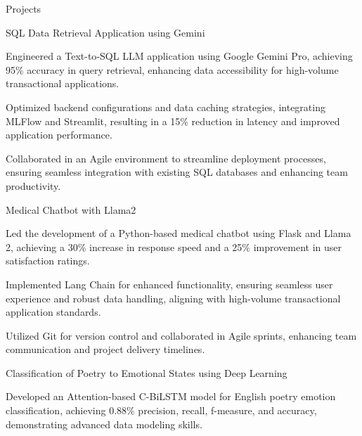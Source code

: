 \documentclass{resume} %
\begin{document}
    \begin{rSection}{Projects}
                    \begin{rSubsection}
                                    {SQL Data Retrieval Application using Gemini}
                                {}{}{}
                                    \item Engineered a Text{-}to{-}SQL LLM application using Google Gemini Pro, achieving 95\% accuracy in query retrieval, enhancing data accessibility for high{-}volume transactional applications.
                                    \item Optimized backend configurations and data caching strategies, integrating MLFlow and Streamlit, resulting in a 15\% reduction in latency and improved application performance.
                                    \item Collaborated in an Agile environment to streamline deployment processes, ensuring seamless integration with existing SQL databases and enhancing team productivity.
                            \end{rSubsection}
                    \begin{rSubsection}
                                    {Medical Chatbot with Llama2}
                                {}{}{}
                                    \item Led the development of a Python{-}based medical chatbot using Flask and Llama 2, achieving a 30\% increase in response speed and a 25\% improvement in user satisfaction ratings.
                                    \item Implemented Lang Chain for enhanced functionality, ensuring seamless user experience and robust data handling, aligning with high{-}volume transactional application standards.
                                    \item Utilized Git for version control and collaborated in Agile sprints, enhancing team communication and project delivery timelines.
                            \end{rSubsection}
                    \begin{rSubsection}
                                    {Classification of Poetry to Emotional States using Deep Learning}
                                {}{}{}
                                    \item Developed an Attention{-}based C{-}BiLSTM model for English poetry emotion classification, achieving 0.88\% precision, recall, f{-}measure, and accuracy, demonstrating advanced data modeling skills.

\end{rSubsection}
\end{rSection}
\end{document}
